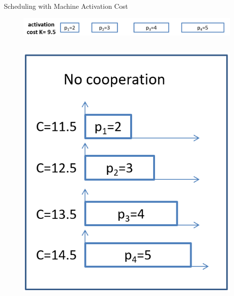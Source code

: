 \documentclass[14pt]{beamer}
\begin{document}
\begin{frame}{Scheduling with Machine Activation Cost}

  \begin{figure}[H]
  \centering
  \includegraphics[width=1\textwidth]{Sche1.png}
  \end{figure}
  \centering

  \begin{columns}
  \begin{column}{4.5cm}
  \vspace{-2cm}
  \begin{figure}[H]
  \centering
  \includegraphics[width=1.1\textwidth]{Sche2.png}
  \end{figure}
  \end{column}


\end{columns}
\end{frame}
\end{document}
